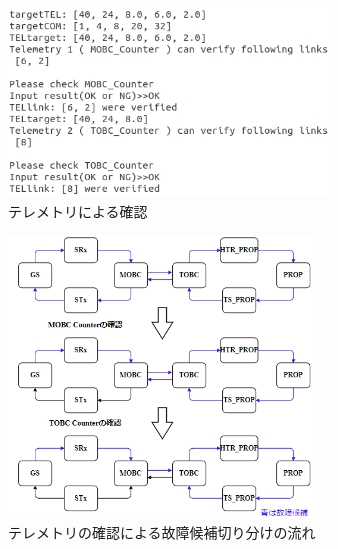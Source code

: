 \documentclass[11pt]{jsreport}
\begin{document}
\begin{figure}[H]
   \centering
      \includegraphics[height=5.0cm]{figure/COM14_TEL17_TEL_phase.png}
      \caption{テレメトリによる確認}
      \label{fig:tel_phase}
\end{figure}
\begin{figure}[H]
   \centering
      \includegraphics[height=7.5cm]{figure/TEL_process_HTR_PROP_fault.png}
      \caption{テレメトリの確認による故障候補切り分けの流れ}
      \label{fig:TEL_process}
\end{figure}
\end{document}
